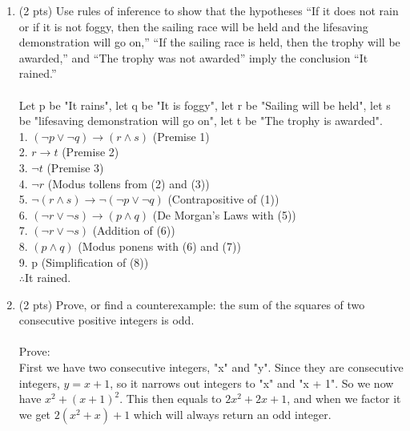 \documentclass[12pt]{article}
\begin{document}
\begin{enumerate}
\item (2 pts)
Use rules of inference to show that the hypotheses “If it
does not rain or if it is not foggy, then the sailing race will
be held and the lifesaving demonstration will go on,” “If
the sailing race is held, then the trophy will be awarded,”
and “The trophy was not awarded” imply the conclusion
“It rained.”\\
\\Let p be "It rains", let q be "It is foggy", let r be "Sailing will be held", let s be "lifesaving demonstration will go on", let t be "The trophy is awarded".
\\1. $(\lnot p \lor \lnot q) \rightarrow (r \land s)$ (Premise 1)
\\2. $r \rightarrow t$ (Premise 2)
\\3. $\lnot t$ (Premise 3)
\\4. $\lnot r$ (Modus tollens from (2) and (3))
\\5. $\lnot (r \land s) \rightarrow \lnot (\lnot p \lor \lnot q)$ (Contrapositive of (1))
\\6. $(\lnot r \lor \lnot s) \rightarrow (p \land q)$ (De Morgan's Laws with (5))
\\7. $(\lnot r \lor \lnot s)$ (Addition of (6))
\\8. $(p \land q)$ (Modus ponens with (6) and (7))
\\9. p (Simplification of (8))
\\$\therefore$It rained.


\item (2 pts) Prove, or find a counterexample: the sum of the squares of two consecutive positive integers is odd.\\
\\Prove:
\\First we have two consecutive integers, "x" and "y". Since they are consecutive integers, $y = x + 1$, so it narrows out integers to "x" and "x + 1". So we now have $x^2 + (x + 1)^2$. This then equals to $2x^2 + 2x + 1$, and when we factor it we get $2(x^2 + x) + 1$ which will always return an odd integer.


\end{enumerate}
\end{document}
